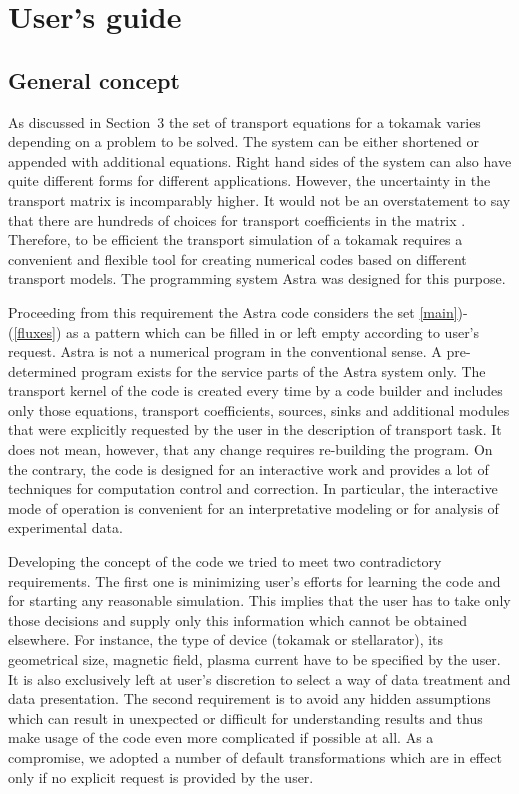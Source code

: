 \section{User's guide}

\subsection{General concept}

As discussed in Section~3 the set of transport equations for a tokamak
varies depending on a problem to be solved.
The system  can be either shortened or appended with additional
equations.
Right hand sides of the system can also have quite different forms for
different applications.
However, the uncertainty in the transport matrix  is
incomparably higher.
It would not be an overstatement to say that there are hundreds of
choices for transport coefficients in the matrix .
Therefore, to be efficient the transport simulation of a tokamak
requires a convenient and flexible tool for creating numerical codes
based on different transport models.
The programming system Astra was designed for this purpose.

Proceeding from this requirement the Astra code considers the set
\eqs\ref{main})-(\ref{fluxes}) as a pattern which can be filled in or
left empty according to user's request.
Astra is not a numerical program in the conventional sense.
A pre-determined program exists for the service parts of the Astra
system only. 
The transport kernel of the code is created every time by a code builder
and includes only those equations,
transport coefficients, sources, sinks and additional modules that were
explicitly requested by the user in the description of transport task.
It does not mean, however, that any change requires re-building the
program. 
On the contrary, the code is designed for an interactive work and
provides a lot of techniques for computation control and correction.
In particular, the interactive mode of operation is convenient for an
interpretative modeling or for analysis of experimental data.

Developing the concept of the code we tried to meet two contradictory
requirements. 
The first one is minimizing user's efforts for learning the code and for
starting any reasonable simulation. 
This implies that the user has to take only those decisions and supply
only this information which cannot be obtained elsewhere.
For instance, the type of device (tokamak or stellarator), its
geometrical size, magnetic field, plasma current have to be specified by
the user.
It is also exclusively left at user's discretion to select a way of data
treatment and data presentation.
The second requirement is to avoid any hidden assumptions which can
result in unexpected or difficult for understanding results and thus
make usage of the code even more complicated if possible at all.  
As a compromise, we adopted a number of default transformations which
are in effect only if no explicit request is provided by the user.

